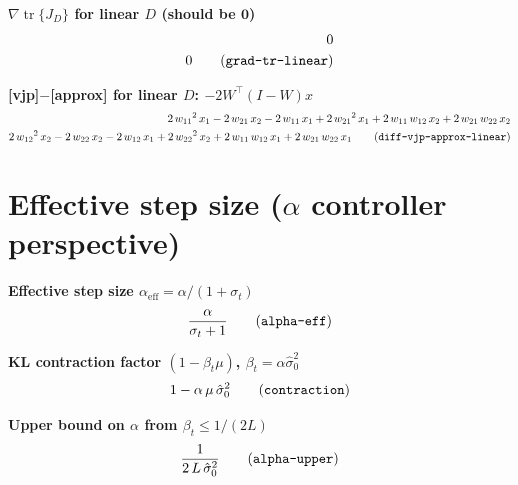 \documentclass{article}
\begin{document}
\noindent\textbf{$\nabla\operatorname{tr}\{J_D\}$ for linear $D$  (should be $\mathbf{0}$)}
\begin{align}
  0 \\
  0
  \tag{\texttt{grad-tr-linear}}
\end{align}

\noindent\textbf{[vjp]$-$[approx] for linear $D$: $-2W^\top(I-W)x$}
\begin{align}
  2\,{w_{11}}^2\,x_{1}-2\,w_{21}\,x_{2}-2\,w_{11}\,x_{1}+2\,{w_{21}}^2\,x_{1}+2\,w_{11}\,w_{12}\,x_{2}+2\,w_{21}\,w_{22}\,x_{2} \\
  2\,{w_{12}}^2\,x_{2}-2\,w_{22}\,x_{2}-2\,w_{12}\,x_{1}+2\,{w_{22}}^2\,x_{2}+2\,w_{11}\,w_{12}\,x_{1}+2\,w_{21}\,w_{22}\,x_{1}
  \tag{\texttt{diff-vjp-approx-linear}}
\end{align}

\section{Effective step size ($\alpha$ controller perspective)}

\noindent\textbf{Effective step size $\alpha_\mathrm{eff} = \alpha/(1+\sigma_t)$}
\begin{align}
  \frac{\alpha }{\sigma _{t}+1} \tag{\texttt{alpha-eff}}
\end{align}

\noindent\textbf{KL contraction factor $(1 - \beta_t \mu)$,  $\beta_t = \alpha\hat{\sigma}_0^2$}
\begin{align}
  1-\alpha \,\mu \,{\hat{\sigma }_{0}}^2 \tag{\texttt{contraction}}
\end{align}

\noindent\textbf{Upper bound on $\alpha$ from $\beta_t \le 1/(2L)$}
\begin{align}
  \frac{1}{2\,L\,{\hat{\sigma }_{0}}^2} \tag{\texttt{alpha-upper}}
\end{align}
\end{document}
